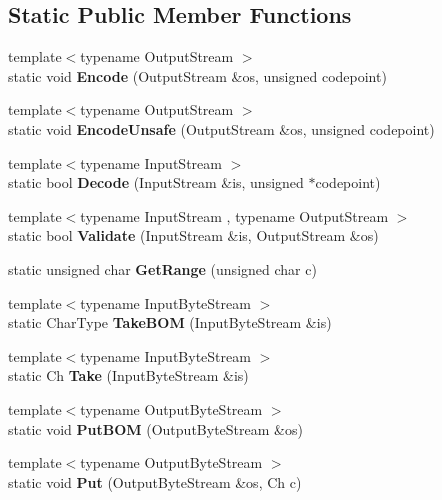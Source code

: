 \subsection*{Static Public Member Functions}
\begin{DoxyCompactItemize}
\item 
\mbox{\label{struct_u_t_f8_af286ed19ca60d261a9b11b65bee1298b}} 
{\footnotesize template$<$typename Output\+Stream $>$ }\\static void {\bfseries Encode} (Output\+Stream \&os, unsigned codepoint)
\item 
\mbox{\label{struct_u_t_f8_aac6bdaf03c114265384b2ae3e425e7a8}} 
{\footnotesize template$<$typename Output\+Stream $>$ }\\static void {\bfseries Encode\+Unsafe} (Output\+Stream \&os, unsigned codepoint)
\item 
\mbox{\label{struct_u_t_f8_a17c6badb31acf4f784111c886737fb17}} 
{\footnotesize template$<$typename Input\+Stream $>$ }\\static bool {\bfseries Decode} (Input\+Stream \&is, unsigned $\ast$codepoint)
\item 
\mbox{\label{struct_u_t_f8_a9e2e7e37d819baeb5e643654c6e61e33}} 
{\footnotesize template$<$typename Input\+Stream , typename Output\+Stream $>$ }\\static bool {\bfseries Validate} (Input\+Stream \&is, Output\+Stream \&os)
\item 
\mbox{\label{struct_u_t_f8_ac06bbf38df41adb0c7b9eaa93f85cc38}} 
static unsigned char {\bfseries Get\+Range} (unsigned char c)
\item 
\mbox{\label{struct_u_t_f8_a1b2359d6ea50ae32fefc9b28e9878a31}} 
{\footnotesize template$<$typename Input\+Byte\+Stream $>$ }\\static Char\+Type {\bfseries Take\+B\+OM} (Input\+Byte\+Stream \&is)
\item 
\mbox{\label{struct_u_t_f8_a5b2561a5031c8a699e593cd51b2c6864}} 
{\footnotesize template$<$typename Input\+Byte\+Stream $>$ }\\static Ch {\bfseries Take} (Input\+Byte\+Stream \&is)
\item 
\mbox{\label{struct_u_t_f8_a6b171e5f0662ad81d498875bbdbc536a}} 
{\footnotesize template$<$typename Output\+Byte\+Stream $>$ }\\static void {\bfseries Put\+B\+OM} (Output\+Byte\+Stream \&os)
\item 
\mbox{\label{struct_u_t_f8_ab24c23227413798e9be28a21eb26fe51}} 
{\footnotesize template$<$typename Output\+Byte\+Stream $>$ }\\static void {\bfseries Put} (Output\+Byte\+Stream \&os, Ch c)
\end{DoxyCompactItemize}


